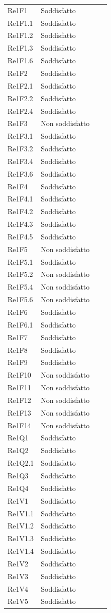 \begin{longtable}{C{3cm} C{3cm} L{5.5cm} C{3cm}}
Re1F1 	& Soddisfatto\\
Re1F1.1 & Soddisfatto\\
Re1F1.2 & Soddisfatto\\
Re1F1.3 & Soddisfatto\\
Re1F1.6 & Soddisfatto\\
Re1F2 	& Soddisfatto\\
Re1F2.1 & Soddisfatto\\
Re1F2.2 & Soddisfatto\\
Re1F2.4 & Soddisfatto\\
Re1F3 	& Non soddisfatto\\
Re1F3.1 & Soddisfatto\\
Re1F3.2 & Soddisfatto\\
Re1F3.4 & Soddisfatto\\
Re1F3.6 & Soddisfatto\\
Re1F4 	& Soddisfatto\\
Re1F4.1 & Soddisfatto\\
Re1F4.2 & Soddisfatto\\
Re1F4.3 & Soddisfatto\\
Re1F4.5 & Soddisfatto\\
Re1F5 	& Non soddisfatto\\
Re1F5.1 & Soddisfatto\\
Re1F5.2 & Non soddisfatto\\
Re1F5.4 & Non soddisfatto\\
Re1F5.6 & Non soddisfatto\\
Re1F6 	& Soddisfatto\\
Re1F6.1 & Soddisfatto\\
Re1F7 	& Soddisfatto\\
Re1F8 	& Soddisfatto\\
Re1F9 	& Soddisfatto\\
Re1F10 	& Non soddisfatto\\
Re1F11 	& Non soddisfatto\\
Re1F12 	& Non soddisfatto\\
Re1F13 	& Non soddisfatto\\
Re1F14 	& Non soddisfatto\\
Re1Q1 	& Soddisfatto\\
Re1Q2 	& Soddisfatto\\
Re1Q2.1 & Soddisfatto\\
Re1Q3 	& Soddisfatto\\
Re1Q4 	& Soddisfatto\\
Re1V1 	& Soddisfatto\\
Re1V1.1 & Soddisfatto\\
Re1V1.2 & Soddisfatto\\
Re1V1.3 & Soddisfatto\\
Re1V1.4 & Soddisfatto\\
Re1V2 	& Soddisfatto\\
Re1V3 	& Soddisfatto\\
Re1V4 	& Soddisfatto\\
Re1V5 	& Soddisfatto\\
\end{longtable}

